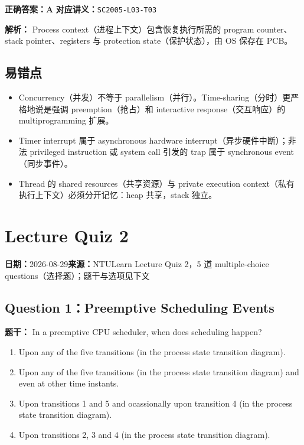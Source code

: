 \documentclass[11pt,a4paper,fontset=fandol]{ctexart}
\renewcommand{\exercisequestion}[2]{%
  \Needspace{5\baselineskip}%
  \subsection{#2}\label{exercise:#1}%
}
\renewcommand{\exercisemeta}[5]{%
  {\small\textbf{日期：}#2\quad\textbf{来源：}#3\par}%
}
\renewenvironment{checkedsolution}
  {\par\nopagebreak[4]\textbf{解析：}\ignorespaces}
  {\par}
\begin{document}
\textbf{正确答案：A}\qquad
\textbf{对应讲义：}\texttt{SC2005-L03-T03}

\begin{checkedsolution}
Process context（进程上下文）包含恢复执行所需的 program counter、stack pointer、registers 与 protection state（保护状态），由 OS 保存在 PCB。
\end{checkedsolution}

\subsection{易错点}

\begin{itemize}
  \item Concurrency（并发）不等于 parallelism（并行）。Time-sharing（分时）更严格地说是强调 preemption（抢占）和 interactive response（交互响应）的 multiprogramming 扩展。
  \item Timer interrupt 属于 asynchronous hardware interrupt（异步硬件中断）；非法 privileged instruction 或 system call 引发的 trap 属于 synchronous event（同步事件）。
  \item Thread 的 shared resources（共享资源）与 private execution context（私有执行上下文）必须分开记忆：heap 共享，stack 独立。
\end{itemize}

\section{Lecture Quiz 2}
\label{homework:SC2005-HW02}

\exercisemeta
  {SC2005-HW02}
  {2026-08-29}
  {NTULearn Lecture Quiz 2，5 道 multiple-choice questions（选择题）；题干与选项见下文}
  {已完成，并根据平台满分反馈逐题核对}
  {是（2026-08-29）}

\exercisequestion{SC2005-HW02-Q01}{Question 1：Preemptive Scheduling Events}

\textbf{题干：} In a preemptive CPU scheduler, when does scheduling happen?

\begin{enumerate}[label=\Alph*.,leftmargin=2.4em]
  \item Upon any of the five transitions (in the process state transition diagram).
  \item Upon any of the five transitions (in the process state transition diagram) and even at other time instants.
  \item Upon transitions 1 and 5 and ocassionally upon transition 4 (in the process state transition diagram).
  \item Upon transitions 2, 3 and 4 (in the process state transition diagram).
\end{enumerate}
\end{document}
